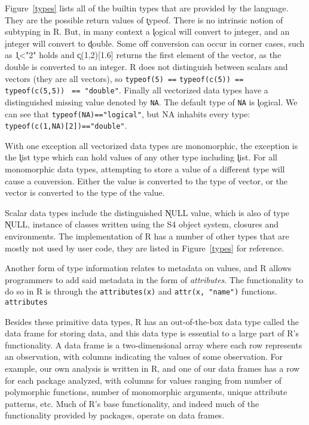 \documentclass[acmsmall,10pt,review,anonymous]{acmart}\settopmatter{printfolios=true,printccs=false,printacmref=false}
\newcommand{\code}[1]{\lstinline|#1|\xspace}
\begin{document}
Figure~\ref{types} lists all of the builtin types that are provided by the
language. They are the possible return values of \k{typeof}. There is no
intrinsic notion of subtyping in R. But, in many context a \k{logical} will
convert to \k{integer}, and an \k{integer} will convert to \k{double}.  Some
off conversion can occur in corner cases, such as \k{1<"2"} holds and
\k{c(1,2)[1.6]} returns the first element of the vector, as the double is
converted to an integer. R does not distinguish between scalars and vectors
(they are all vectors), so \code{typeof(5) ==} \code{typeof(c(5)) ==
  typeof(c(5,5))} \code{ == "double"}. Finally all vectorized data types have a
distinguished missing value denoted by \code{NA}. The default type of
\code{NA} is \k{logical}. We can see that \code{typeof(NA)=="logical"}, but
NA inhabits every type: \code{typeof(c(1,NA)[2])=="double"}.

With one exception all vectorized data types are monomorphic, the exception
is the \k{list} type which can hold values of any other type including
\k{list}. For all monomorphic data types, attempting to store a value of a
different type will cause a conversion. Either the value is converted to the
type of vector, or the vector is converted to the type of the value.

Scalar data types include the distinguished \k{NULL} value, which is also of
type \k{NULL}, instance of classes written using the S4 object system,
closures and environments.  The implementation of R has a number of other
types that are mostly not used by user code, they are listed in
Figure~\ref{types} for reference.


Another form of type information relates to metadata on values, and R allows
programmers to add said metadata in the form of {\it attributes}.  The
functionality to do so in R is through the \code{attributes(x)} and
\code{attr(x, "name")} functions.  \code{attributes}


Besides these primitive data types, R has an out-of-the-box data type called
the data frame for storing data, and this data type is essential to a large
part of R's functionality.  A data frame is a two-dimensional array where
each row represents an observation, with columns indicating the values of
some observation.  For example, our own analysis is written in R, and one of
our data frames has a row for each package analyzed, with columns for values
ranging from number of polymorphic functions, number of monomorphic
arguments, unique attribute patterns, etc.    Much of R's
base functionality, and indeed much of the functionality provided by
packages, operate on data frames.
\end{document}
